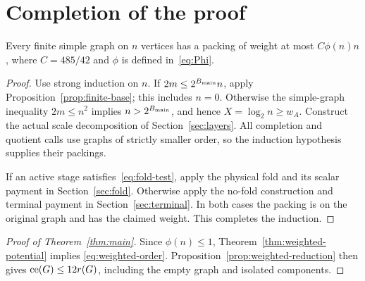 \section{Completion of the proof}\label{sec:induction}
\begin{theorem}\label{thm:weighted-potential}
Every finite simple graph on $n$ vertices has a packing of weight at most
$C\phi(n)n$, where $C=485/42$ and $\phi$ is defined in~\eqref{eq:Phi}.
\end{theorem}
\begin{proof}
Use strong induction on $n$. If $2m\le2^{B_{\rm main}}n$, apply
Proposition~\ref{prop:finite-base}; this includes $n=0$.
Otherwise the simple-graph inequality $2m\le n^2$ implies
$n>2^{B_{\rm main}}$, and hence $X=\log_2n\ge w_A$.
Construct the actual scale decomposition of Section~\ref{sec:layers}.
All completion and quotient calls use graphs of strictly smaller order,
so the induction hypothesis supplies their packings.

If an active stage satisfies~\eqref{eq:fold-test}, apply the physical fold
and its scalar payment in Section~\ref{sec:fold}. Otherwise apply the
no-fold construction and terminal payment in Section~\ref{sec:terminal}.
In both cases the packing is on the original graph and has the claimed
weight. This completes the induction.
\end{proof}

\begin{proof}[Proof of Theorem~\ref{thm:main}]
Since $\phi(n)\le1$, Theorem~\ref{thm:weighted-potential} implies
\eqref{eq:weighted-order}. Proposition~\ref{prop:weighted-reduction}
then gives $\operatorname{ce}(G)\le12r(G)$, including the empty graph and isolated
components.
\end{proof}
